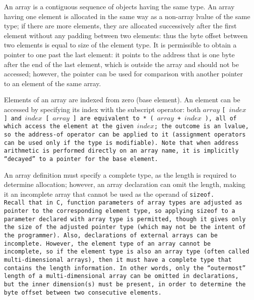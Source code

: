 \def\Section#1{\section{#1}}

An array is a contiguous sequence of objects having the same type.
An array having one element is allocated in the same way as a non-array
lvalue of the same type; if there are more elements, they are allocated
successively after the first element without any padding between two elements:
thus the byte offset between two elements is equal to size of the element type.
It is permissible to obtain a pointer to one past the last element:
it points to the address that is one byte after the end of the last element,
which is outside the array and should not be accessed; however, the pointer
can be used for comparison with another pointer to an element of the same array.

Elements of an array are indexed from zero (base element).
An element can be accessed by specifying its index with the subscript operator:
both $array$ \tt{[} $index$ \tt{]} and $index$ \tt{[} $array$ \tt{]} are equivalent
to \tt{* (} $array$ \tt{+} $index$ \tt{)}, all of which access the element at
the given $index$; the outcome is an lvalue, so the address-of operator can be
applied to it (assignment operators can be used only if the type is modifiable).
Note that when address arithmetic is performed directly on an array name,
it is implicitly ``decayed'' to a pointer for the base element.

An array definition must specify a complete type, as the length is required to
determine allocation; however, an array declaration can omit the length, making
it an incomplete array that cannot be used as the operand of \tt{sizeof}.\\
Recall that in C, function parameters of array types are adjusted as pointer
to the corresponding element type, so applying \tt{sizeof} to a parameter
declared with array type is permitted, though it gives only the size of
the adjusted pointer type (which may not be the intent of the programmer).
Also, declarations of external arrays can be incomplete.
However, the element type of an array cannot be incomplete, so if the
element type is also an array type (often called multi-dimensional arrays),
then it must have a complete type that contains the length information.
In other words, only the ``outermost'' length of a multi-dimensional array
can be omitted in declarations, but the inner dimension(s) must be present,
in order to determine the byte offset between two consecutive elements.

